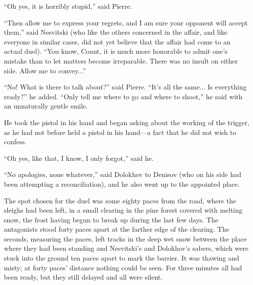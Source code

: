 ``Oh yes, it is horribly stupid,'' said Pierre.

``Then allow me to express your regrets, and I am sure your
opponent will accept them,'' said Nesvitski (who like the others
concerned in the affair, and like everyone in similar cases, did
not yet believe that the affair had come to an actual
duel). ``You know, Count, it is much more honorable to admit
one's mistake than to let matters become irreparable.  There was
no insult on either side. Allow me to convey...''

``No! What is there to talk about?'' said Pierre. ``It's all the
same...  Is everything ready?'' he added. ``Only tell me where to
go and where to shoot,'' he said with an unnaturally gentle
smile.

He took the pistol in his hand and began asking about the working
of the trigger, as he had not before held a pistol in his
hand---a fact that he did not wish to confess.

``Oh yes, like that, I know, I only forgot,'' said he.

``No apologies, none whatever,'' said Dolokhov to Denisov (who on
his side had been attempting a reconciliation), and he also went
up to the appointed place.

The spot chosen for the duel was some eighty paces from the road,
where the sleighs had been left, in a small clearing in the pine
forest covered with melting snow, the frost having begun to break
up during the last few days. The antagonists stood forty paces
apart at the farther edge of the clearing. The seconds, measuring
the paces, left tracks in the deep wet snow between the place
where they had been standing and Nesvitski's and Dolokhov's
sabers, which were stuck into the ground ten paces apart to mark
the barrier. It was thawing and misty; at forty paces' distance
nothing could be seen. For three minutes all had been ready, but
they still delayed and all were silent.


